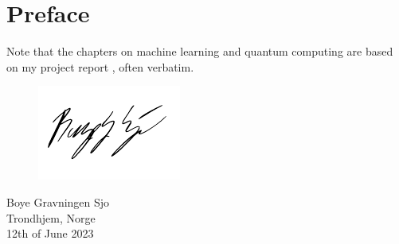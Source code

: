 \section*{Preface}
\lipsum[1]

Note that the chapters on machine learning and quantum computing are based on my project report \autocite{sjo2021}, often verbatim.

\vspace{1.5cm}
\begin{figure}[h]
    \raggedleft
    \includegraphics[width=0.3\linewidth]{blank.pdf}
\end{figure}
\begin{flushright}
    \vspace{-1.3cm}
    Boye Gravningen Sjo \\
    Trondhjem, Norge \\
    12th of June 2023
\end{flushright}

\cleardoublepage